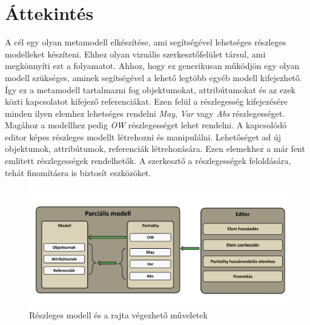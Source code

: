 \chapter{Áttekintés}


A cél egy olyan metamodell elkészítése, ami segítségével lehetséges részleges modelleket készíteni. Ehhez olyan vizuális szerkesztőfelület társul, ami megkönnyíti ezt a folyamatot. Ahhoz, hogy ez generikusan működjön egy olyan modell szükséges, aminek segítségével a lehető legtöbb egyéb modell kifejezhető. Így ez a metamodell tartalmazni fog objektumokat, attribútumokat és az ezek közti kapcsolatot kifejező referenciákat. Ezen felül a részlegesség kifejezésére minden ilyen elemhez lehetséges rendelni \textit{May}, \textit{Var} vagy \textit{Abs} részlegességet. Magához a modellhez pedig \textit{OW} részlegességet lehet rendelni.
A kapcsolódó editor képes részleges modellt létrehozni és manipulálni. Lehetőséget ad új objektumok, attribútumok, referenciák létrehozására. Ezen elemekhez a már fent említett részlegességek rendelhetők. A szerkesztő a részlegességek feloldására, tehát finomításra is biztosít eszközöket.



\begin{figure}[!ht]
	\includegraphics[width=150mm]{figures/overview.pdf}
	\caption{Részleges modell és a rajta végezhető műveletek} 
\end{figure}

